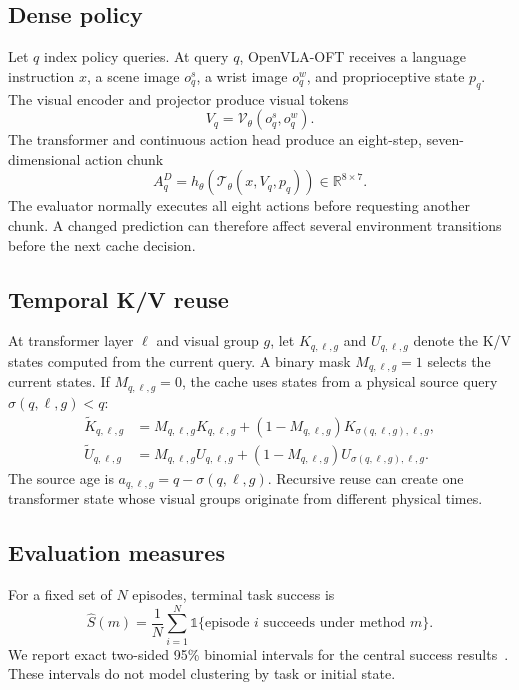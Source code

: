 \documentclass[journal]{IEEEtran}
\begin{document}
\subsection{Dense policy}
Let $q$ index policy queries. At query $q$, OpenVLA-OFT receives a language instruction $x$, a scene image $o_q^s$, a wrist image $o_q^w$, and proprioceptive state $p_q$. The visual encoder and projector produce visual tokens
\begin{equation}
    V_q = \mathcal{V}_{\theta}(o_q^s,o_q^w).
    \label{eq:visual}
\end{equation}
The transformer and continuous action head produce an eight-step, seven-dimensional action chunk
\begin{equation}
    A_q^D = h_{\theta}\!\left(\mathcal{T}_{\theta}(x,V_q,p_q)\right)
    \in \mathbb{R}^{8\times 7}.
    \label{eq:dense}
\end{equation}
The evaluator normally executes all eight actions before requesting another chunk. A changed prediction can therefore affect several environment transitions before the next cache decision.

\subsection{Temporal K/V reuse}
At transformer layer $\ell$ and visual group $g$, let $K_{q,\ell,g}$ and $U_{q,\ell,g}$ denote the K/V states computed from the current query. A binary mask $M_{q,\ell,g}=1$ selects the current states. If $M_{q,\ell,g}=0$, the cache uses states from a physical source query $\sigma(q,\ell,g)<q$:
\begin{align}
\widetilde K_{q,\ell,g} &= M_{q,\ell,g}K_{q,\ell,g}
 +(1-M_{q,\ell,g})K_{\sigma(q,\ell,g),\ell,g}, \\
\widetilde U_{q,\ell,g} &= M_{q,\ell,g}U_{q,\ell,g}
 +(1-M_{q,\ell,g})U_{\sigma(q,\ell,g),\ell,g}.
\label{eq:mix}
\end{align}
The source age is $a_{q,\ell,g}=q-\sigma(q,\ell,g)$. Recursive reuse can create one transformer state whose visual groups originate from different physical times.

\subsection{Evaluation measures}
For a fixed set of $N$ episodes, terminal task success is
\begin{equation}
    \widehat S(m)=\frac{1}{N}\sum_{i=1}^{N}
    \mathbb{1}\{\text{episode }i\text{ succeeds under method }m\}.
    \label{eq:success}
\end{equation}
We report exact two-sided 95\% binomial intervals for the central success results~\cite{clopper1934intervals}. These intervals do not model clustering by task or initial state.
\end{document}

